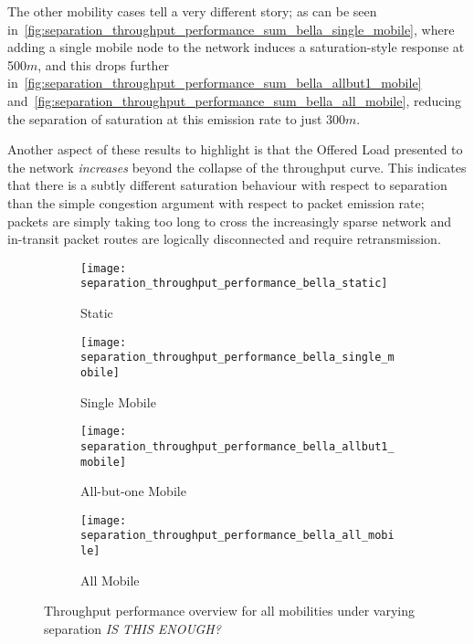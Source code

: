 The other mobility cases tell a very different story; as can be seen in~\autoref{fig:separation_throughput_performance_sum_bella_single_mobile}, where adding a single mobile node to the network induces a saturation-style response at 500$m$, and this drops further in~\autoref{fig:separation_throughput_performance_sum_bella_allbut1_mobile} and~\autoref{fig:separation_throughput_performance_sum_bella_all_mobile}, reducing the separation of saturation at this emission rate to just 300$m$.

Another aspect of these results to highlight is that the Offered Load presented to the network \emph{increases} beyond the collapse of the throughput curve. 
This indicates that there is a subtly different saturation behaviour with respect to separation than the simple congestion argument with respect to packet emission rate; packets are simply taking too long to cross the increasingly sparse network and in-transit packet routes are logically disconnected and require retransmission.

\begin{figure}[h]
  \begin{subfigure}[t]{0.5\textwidth}
    \centering
    \texttt{[image: separation\_throughput\_performance\_bella\_static]}
    \caption{Static}
    \label{fig:separation_throughput_performance_sum_bella_static}
  \end{subfigure}
  \begin{subfigure}[t]{0.5\textwidth}
    \centering
    \texttt{[image: separation\_throughput\_performance\_bella\_single\_mobile]}
    \caption{Single Mobile}
    \label{fig:separation_throughput_performance_sum_bella_single_mobile}
  \end{subfigure}

  \begin{subfigure}[t]{0.5\textwidth}
    \centering
    \texttt{[image: separation\_throughput\_performance\_bella\_allbut1\_mobile]}
    \caption{All-but-one Mobile}
    \label{fig:separation_throughput_performance_sum_bella_allbut1_mobile}
  \end{subfigure}  
  \begin{subfigure}[t]{0.5\textwidth}
    \centering
    \texttt{[image: separation\_throughput\_performance\_bella\_all\_mobile]}
    \caption{All Mobile}
    \label{fig:separation_throughput_performance_sum_bella_all_mobile}
  \end{subfigure}  
  \caption{Throughput performance overview for all mobilities under varying separation \emph{IS THIS ENOUGH?}}
  \label{fig:separation_all}
\end{figure}

